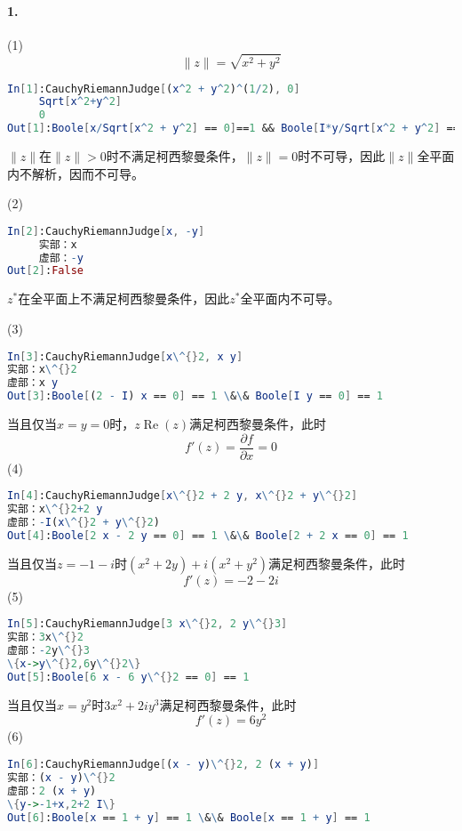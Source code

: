 \documentclass[UTF8]{ctexart}
\newcommand{\tmop}[1]{\ensuremath{\operatorname{#1}}}
\begin{document}
\paragraph{1.}(1)
\[ \| z \| = \sqrt{x^2 + y^2} \]
\begin{lstlisting}[language=Mathematica,style=mathematica]
  In[1]:CauchyRiemannJudge[(x^2 + y^2)^(1/2), 0]
     Sqrt[x^2+y^2]
     0
Out[1]:Boole[x/Sqrt[x^2 + y^2] == 0]==1 && Boole[I*y/Sqrt[x^2 + y^2] == 0]==1
\end{lstlisting}

$\| z \|$在$\| z \| > 0$时不满足柯西黎曼条件，$\| z \| =
0$时不可导，因此$\| z \|$全平面内不解析，因而不可导。

(2)

\begin{lstlisting}[language=Mathematica,style=mathematica]
  In[2]:CauchyRiemannJudge[x, -y]
     实部：x
     虚部：-y
Out[2]:False
\end{lstlisting}

$z^{\ast}$在全平面上不满足柯西黎曼条件，因此$z^{\ast}$全平面内不可导。

(3)
\begin{lstlisting}[language=Mathematica,style=mathematica]
In[3]:CauchyRiemannJudge[x\^{}2, x y]
实部：x\^{}2
虚部：x y
Out[3]:Boole[(2 - I) x == 0] == 1 \&\& Boole[I y == 0] == 1
\end{lstlisting}


当且仅当$x = y = 0$时，$z \tmop{Re}
(z)$满足柯西黎曼条件，此时
\[ f' (z) = \frac{\partial f}{\partial x} = 0 \]
(4)
\begin{lstlisting}[language=Mathematica,style=mathematica]
In[4]:CauchyRiemannJudge[x\^{}2 + 2 y, x\^{}2 + y\^{}2]
实部：x\^{}2+2 y
虚部：-I(x\^{}2 + y\^{}2)
Out[4]:Boole[2 x - 2 y == 0] == 1 \&\& Boole[2 + 2 x == 0] == 1
\end{lstlisting}

当且仅当$z = - 1 - i$时$(x^2 + 2 y) + i (x^2 +
y^2)$满足柯西黎曼条件，此时
\[ f' (z) = - 2 - 2 i \]
(5)
\begin{lstlisting}[language=Mathematica,style=mathematica]
In[5]:CauchyRiemannJudge[3 x\^{}2, 2 y\^{}3]
实部：3x\^{}2
虚部：-2y\^{}3
\{x->y\^{}2,6y\^{}2\}
Out[5]:Boole[6 x - 6 y\^{}2 == 0] == 1
\end{lstlisting}


当且仅当$x = y^2$时$3 x^2 + 2 i y^3$满足柯西黎曼条件，此时
\[ f' (z) = 6 y^2 \]
(6)
\begin{lstlisting}[language=Mathematica,style=mathematica]
In[6]:CauchyRiemannJudge[(x - y)\^{}2, 2 (x + y)]
实部：(x - y)\^{}2
虚部：2 (x + y)
\{y->-1+x,2+2 I\}
Out[6]:Boole[x == 1 + y] == 1 \&\& Boole[x == 1 + y] == 1
\end{lstlisting}
\end{document}
